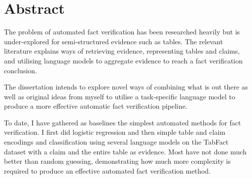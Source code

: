 \chapter*{\Large \center Abstract}

The problem of automated fact verification has been researched heavily but is under-explored for semi-structured evidence such as tables. The relevant literature explains ways of retrieving evidence, representing tables and claims, and utilising language models to aggregate evidence to reach a fact verification conclusion. 

\vspace{\baselineskip}
\noindent The dissertation intends to explore novel ways of combining what is out there as well as original ideas from myself to utilise a task-specific language model to produce a more effective automatic fact verification pipeline.

\vspace{\baselineskip}
\noindent To date, I have gathered as baselines the simplest automated methods for fact verification. I first did logistic regression and then simple table and claim encodings and classification using several language models on the TabFact dataset with a claim and the entire table as evidence. Most have not done much better than random guessing, demonstrating how much more complexity is required to produce an effective automated fact verification method. 

